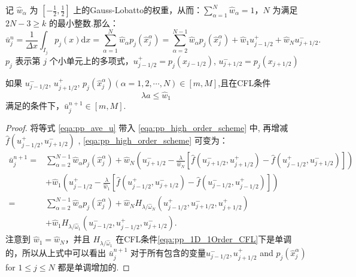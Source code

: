 \documentclass{book}
\begin{document}
\begin{example}
\begin{example}{}{}
\begin{example}
\begin{example}
\begin{example}
记 $\hat{w}_{\alpha}$ 为 $\left[-\frac{1}{2}, \frac{1}{2}\right]$ 上的Gauss-Lobatto的权重，从而：$\sum_{\alpha=1}^{N} \hat{w}_{\alpha}=1$，$N$ 为满足 $2 N-3 \geqslant k$ 的最小整数.那么：
\begin{equation}
    \label{eqa:pp_ave_u}
    \bar{u}_{j}^{n}=\frac{1}{\Delta x} \int_{I_{j}} p_{j}(x) \mathrm{d} x=\sum_{\alpha=1}^{N} \hat{w}_{\alpha} p_{j}\left(\hat{x}_{j}^{\alpha}\right)=\sum_{\alpha=2}^{N-1} \hat{w}_{\alpha} p_{j}\left(\hat{x}_{j}^{\alpha}\right)+\hat{w}_{1} u_{j-1 / 2}^{+}+\hat{w}_{N} u_{j+1 / 2}^{-} .
\end{equation}
$p_j$ 表示第 $j$ 个小单元上的多项式，$u_{j-1/2}^+=p_j(x_{j-1/2})$, $u_{j+1/2}^-=p_j(x_{j+1/2})$
\begin{theorem}{}{}
    如果 $u_{j-1/2}^-$, $u_{j+1/2}^+$, $p_j(\hat{x}_j^\alpha)(\alpha=1,2,\cdots,N)\in[m,M]$,且在CFL条件
    \begin{equation}
        \lambda a \leq \hat{w}_{1}
    \end{equation}
    满足的条件下，$\bar{u}_j^{n+1}\in[m,M]$.
\end{theorem}
\begin{proof}
    将等式 \eqref{eqa:pp_ave_u} 带入 \eqref{eqa:pp_high_order_scheme} 中, 再增减  $\hat{f}\left(u_{j-1 / 2}^{+}, u_{j+1 / 2}^{-}\right)$ , \eqref{eqa:pp_high_order_scheme} 可变为：
    \begin{equation}
        \begin{aligned}
            \bar{u}_{j}^{n+1}= & \sum_{\alpha=2}^{N-1} \hat{w}_{\alpha} p_{j}\left(\hat{x}_{j}^{\alpha}\right)+\hat{w}_{N}\left(u_{j+1 / 2}^{-}-\frac{\lambda}{\hat{w}_{N}}\left[\hat{f}\left(u_{j+1 / 2}^{-}, u_{j+1 / 2}^{+}\right)-\hat{f}\left(u_{j-1 / 2}^{+}, u_{j+1 / 2}^{-}\right)\right]\right) \\
                               & +\hat{w}_{1}\left(u_{j-1 / 2}^{+}-\frac{\lambda}{\hat{w}_{1}}\left[\hat{f}\left(u_{j-1 / 2}^{+}, u_{j+1 / 2}^{-}\right)-\hat{f}\left(u_{j-1 / 2}^{-}, u_{j-1 / 2}^{+}\right)\right]\right)                                                                              \\
            =                  & \sum_{\alpha=2}^{N-1} \hat{w}_{\alpha} p_{j}\left(\hat{x}_{j}^{\alpha}\right)+\hat{w}_{N} H_{\lambda / \hat{\omega}_{N}}\left(u_{j-1 / 2}^{+}, u_{j+1 / 2}^{-}, u_{j+1 / 2}^{+}\right)                                                                                  \\
                               & +\hat{w}_{1} H_{\lambda / \hat{\omega}_{1}}\left(u_{j-1 / 2}^{-}, u_{j-1 / 2}^{+}, u_{j+1 / 2}^{-}\right) .
        \end{aligned}
    \end{equation}
    注意到  $\hat{w}_{1}=\hat{w}_{N}$，并且 $H_{\lambda / \hat{\omega}_{1}}$  在CFL条件\eqref{eqa:pp_1D_1Order_CFL}下是单调的，所以从上式中可以看出 $\bar{u}_{j}^{n+1}$  对于所有包含的变量$u_{j-1 / 2}^{-}, u_{j+1 / 2}^{+}$ and  $p_{j}\left(\hat{x}_{j}^{\alpha}\right)$  for  $1 \leq j \leq N$ 都是单调增加的.


\end{proof}
\end{example}
\end{example}
\end{example}
\end{example}
\end{example}
\end{document}
